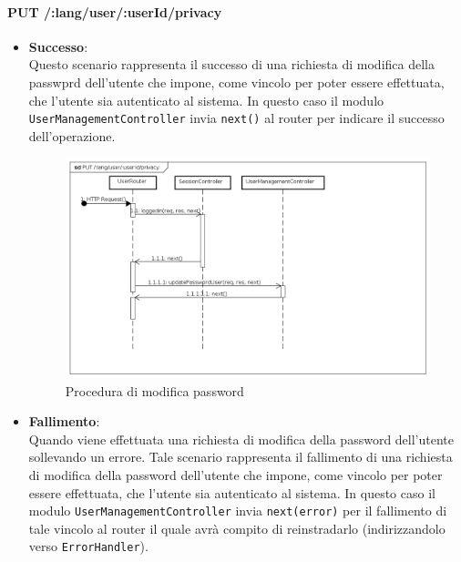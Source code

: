 \paragraph{PUT /:lang/user/:userId/privacy}
\begin{itemize}
\item \textbf{Successo}:
\\
Questo scenario rappresenta il successo di una richiesta di modifica della passwprd dell'utente che impone, come vincolo per poter essere effettuata, che l'utente sia autenticato al sistema.  
In questo caso il modulo \texttt{UserManagementController} invia \texttt{next()} al router per indicare il successo dell'operazione.

\label{Procedura di modifica password}
\begin{figure}[ht]
	\centering
	\includegraphics[scale=0.40]{UML/DiagrammiDiSequenza/Back-end/PUT_LangUserUserIdPrivacySuccess.png}
	\caption{Procedura di modifica password}
\end{figure}
\FloatBarrier
\item \textbf{Fallimento}:
\\
Quando viene effettuata una richiesta di modifica della password dell'utente sollevando un errore. Tale scenario rappresenta il fallimento di una richiesta di modifica della password dell'utente che impone, come vincolo per poter essere effettuata, che l'utente sia autenticato al sistema. In questo caso il modulo \texttt{UserManagementController} invia \texttt{next(error)} per il fallimento di tale vincolo al router il quale avrà compito di reinstradarlo (indirizzandolo verso \texttt{ErrorHandler}).




\end{itemize}
